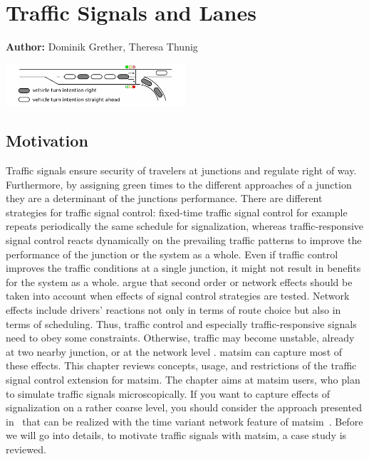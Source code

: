 \chapter{Traffic Signals and Lanes}
\label{ch:signalslanes}

\hfill \textbf{Author:} Dominik Grether, Theresa Thunig

\begin{center} \includegraphics[width=0.5\textwidth, angle=0]{extending/figures/signalslanes/single_queue_model_inkscape.pdf} \end{center}


\section{Motivation}
Traffic signals ensure security of travelers at junctions and regulate right of way. 
Furthermore, by assigning green times to the different approaches of a junction they are a determinant of the junctions performance. 
There are different strategies for traffic signal control: fixed-time traffic signal control for example repeats periodically the same schedule for signalization, whereas traffic-responsive signal control reacts dynamically on the prevailing traffic patterns to improve the performance of the junction or the system as a whole.   
Even if traffic control improves the traffic conditions at a single junction, it might not result in benefits for the system as a whole. 
\citet{Hu1997D2DFlowEvolutionReactiveSignalsDynasmart} argue that second order or network effects should be taken into account when effects of signal control strategies are tested. Network effects include drivers' reactions not only in terms of route choice but also in terms of scheduling. 
Thus, traffic control and especially traffic-responsive signals need to obey some constraints. Otherwise, traffic may become unstable, already at two nearby junction, or at the network level \citep{LaemmerHelbing2010SelfStabilizingSignalControlRealNet}. \gls{matsim} can capture most of these effects. This chapter reviews concepts, usage, and restrictions of the traffic signal control extension for \gls{matsim}. 
The chapter aims at \gls{matsim} users, who plan to simulate traffic signals microscopically. 
If you want to capture effects of signalization on a rather coarse level, you should consider the approach presented in~\citet[pp.~139][]{Charypar2008PhD} that can be realized with the time variant network feature of \gls{matsim}~\citep{LaemmelGretherNagel2009TimeDependentNetworks}. 
Before we will go into details, to motivate traffic signals with \gls{matsim}, a case study is reviewed. 

